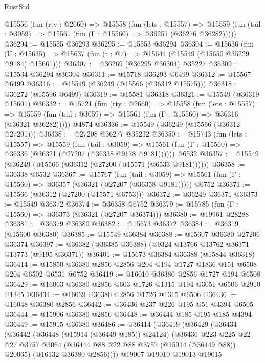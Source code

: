 \begin{lexlean}{RustStd}
\begin{coremodule}
  @15556
    (fun (rty : @2660) =>
    @15558
      (fun (lets : @15557) =>
      @15559 (fun (tail : @3059) => @15561 (fun (Γ : @15560) => @36251 (@36276 @36282)))))
@36294 := @15555 @36293
@36295 := @15553 @36294
@36304 := @15636
    (fun (U : @15635) => @15637 (fun (t : @7) => @15644 (@15549 (@15650 @35229 @9184) @15661)))
@36307 := @36269 (@36295 @36304) @35227
@36309 := @15534 @36294 @36304
@36311 := @15718 @36293 @6499
@36312 := @15567 @6499
@36316 := @15549 (@36249 (@15566 (@36312 @15575)))
@36318 := @36272 (@15596 @6499)
@36319 := @15581 @36318
@36321 := @15549 (@36319 @15601)
@36332 := @15721
    (fun (rty : @2660) =>
    @15558
      (fun (lets : @15557) =>
      @15559 (fun (tail : @3059) => @15561 (fun (Γ : @15560) => @36316 (@36321 @36282)))))
    @4874
@36336 := @15549 (@36249 (@15566 (@36312 @27201)))
@36338 := @27208 @36277 @35232
@36350 := @15743
    (fun (lets : @15557) =>
    @15559
      (fun (tail : @3059) =>
      @15561 (fun (Γ : @15560) => @36336 (@36321 (@27207 (@36338 @9178 @9181))))))
    @6532
@36357 := @15549 (@36249 (@15566 (@36312 (@27200 (@15571 (@6533 @9181))))))
@36358 := @36338 @6532
@36367 := @15767
    (fun (tail : @3059) => @15561 (fun (Γ : @15560) => @36357 (@36321 (@27207 (@36358 @9181)))))
    @6752
@36371 := @15566 (@36312 (@27200 (@15571 @6753)))
@36372 := @36249 @36371
@36373 := @15549 @36372
@36374 := @36358 @6752
@36379 := @15785 (fun (Γ : @15560) => @36373 (@36321 (@27207 @36374)))
@36380 := @19961 @28288
@36381 := @36379 @36380
@36382 := @15673 @36372
@36384 := @36319 (@15600 @36380)
@36385 := @15549 @36384
@36388 := @15607 @36380 @27206 @36374
@36397 := @36382 (@36385 @36388) (@9324 @13766 @13762 @36371 @13773 (@9195 @36371))
@36401 := @15673 @36384 @36388 (@15844 @36318)
@36414 := @15850 @36380 @2856 @2856 @204 @194 @1727 @1836 @151 @6508 @204 @6502 @6531 @6752
@36419 := @16010 @36380 @2856 @1727 @194 @6508
@36429 := @16063 @36380 @2856 @603 @1726 @1315 @194 @3051 @6506 @2910 @1345
@36434 := @16039 @36380 @2856 @1726 @1315 @6506
@36436 := @16048 @36380 @2856
@36442 := @36436 @237 @226 @195 @51 @4394 @6505
@36444 := @15906 @36380 @2856
@36448 := @36444 @185 @195 @185 @4394
@36449 := @15915 @36380
@36486 := @36414
    (@36419
      (@36429
        (@36434
          (@36442
            (@36448 (@15914 (@36449 @185)) @24124)
            (@36436
              @223
              @225
              @22
              @27
              @3757
              @3064
              (@36444 @88 @22 @88 @3757 (@15914 (@36449 @88)) @20065)
              (@16132 @36380 @2856))))
        @19007
        @19010
        @19013
        @19015

\end{coremodule}
\end{lexlean}
